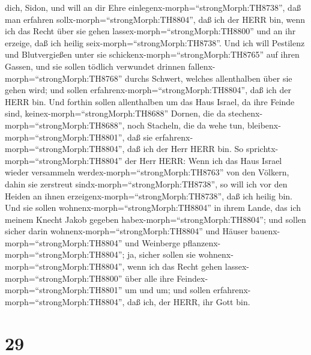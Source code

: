 dich, Sidon, und will an dir Ehre
einlegenx-morph=``strongMorph:TH8738'', daß man erfahren
sollx-morph=``strongMorph:TH8804'', daß ich der HERR bin, wenn ich das
Recht über sie gehen lassex-morph=``strongMorph:TH8800'' und an ihr
erzeige, daß ich heilig seix-morph=``strongMorph:TH8738''. 
Und ich will Pestilenz und Blutvergießen unter sie
schickenx-morph=``strongMorph:TH8765'' auf ihren Gassen, und sie sollen
tödlich verwundet drinnen fallenx-morph=``strongMorph:TH8768'' durchs
Schwert, welches allenthalben über sie gehen wird; und sollen
erfahrenx-morph=``strongMorph:TH8804'', daß ich der HERR bin.
 Und forthin sollen allenthalben um das Haus Israel, da
ihre Feinde sind, keinex-morph=``strongMorph:TH8688'' Dornen, die da
stechenx-morph=``strongMorph:TH8688'', noch Stacheln, die da wehe tun,
bleibenx-morph=``strongMorph:TH8801'', daß sie
erfahrenx-morph=``strongMorph:TH8804'', daß ich der Herr HERR bin.
 So sprichtx-morph=``strongMorph:TH8804'' der Herr HERR:
Wenn ich das Haus Israel wieder versammeln
werdex-morph=``strongMorph:TH8763'' von den Völkern, dahin sie zerstreut
sindx-morph=``strongMorph:TH8738'', so will ich vor den Heiden an ihnen
erzeigenx-morph=``strongMorph:TH8738'', daß ich heilig bin. Und sie
sollen wohnenx-morph=``strongMorph:TH8804'' in ihrem Lande, das ich
meinem Knecht Jakob gegeben habex-morph=``strongMorph:TH8804'';
 und sollen sicher darin
wohnenx-morph=``strongMorph:TH8804'' und Häuser
bauenx-morph=``strongMorph:TH8804'' und Weinberge
pflanzenx-morph=``strongMorph:TH8804''; ja, sicher sollen sie
wohnenx-morph=``strongMorph:TH8804'', wenn ich das Recht gehen
lassex-morph=``strongMorph:TH8800'' über alle ihre
Feindex-morph=``strongMorph:TH8801'' um und um; und sollen
erfahrenx-morph=``strongMorph:TH8804'', daß ich, der HERR, ihr Gott bin.

\hypertarget{section-28}{%
\section{29}\label{section-28}}

